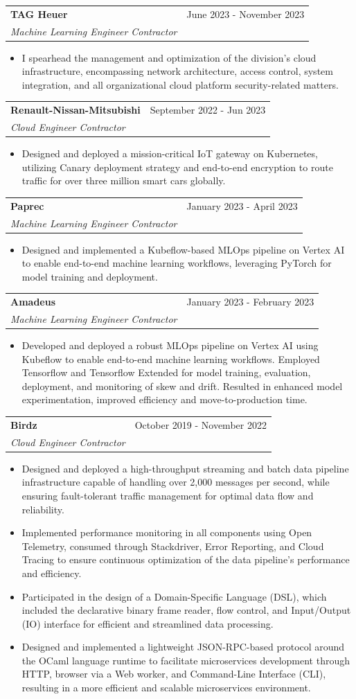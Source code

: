 \documentclass[letterpaper,11pt]{article}
\makeatletter
\newcommand{\resumeItem}[1]{
  \item\small{#1 \vspace{-2pt}}
}
\newcommand{\resumeSubheading}[3]{
  \vspace{-1pt}\item
    \begin{tabular*}{0.97\textwidth}[t]{l@{\extracolsep{\fill}}r}
      \textbf{#1} & #2 \\
      \textit{\small #3} \\
    \end{tabular*}\vspace{-5pt}
}
\newcommand{\resumeItemListStart}{\begin{itemize}}
\newcommand{\resumeItemListEnd}{\end{itemize}\vspace{-5pt}}
\makeatother
\begin{document}
\resumeSubheading{TAG Heuer}
{June 2023 - November 2023}
{Machine Learning Engineer Contractor}
\resumeItemListStart{}
\resumeItem{
	I spearhead the management and optimization of the division's cloud
	infrastructure, encompassing network architecture, access control, system
	integration, and all organizational cloud platform security-related matters.
}
\resumeItemListEnd{}


\resumeSubheading{Renault-Nissan-Mitsubishi}
{September 2022 - Jun 2023}
{Cloud Engineer Contractor}
\resumeItemListStart{}
\resumeItem{
	Designed and deployed a mission-critical IoT gateway on Kubernetes, utilizing
	Canary deployment strategy and end-to-end encryption to route traffic for over
	three million smart cars globally.
}
\resumeItemListEnd{}


\resumeSubheading{Paprec}
{January 2023 - April 2023}
{Machine Learning Engineer Contractor}
\resumeItemListStart{}
\resumeItem{
	Designed and implemented a Kubeflow-based MLOps pipeline on Vertex AI to enable
	end-to-end machine learning workflows, leveraging PyTorch for model training and
	deployment.
}
\resumeItemListEnd{}


\resumeSubheading{Amadeus}
{January 2023 - February 2023}
{Machine Learning Engineer Contractor}
\resumeItemListStart{}
\resumeItem{
	Developed and deployed a robust MLOps pipeline on Vertex AI using Kubeflow to
	enable end-to-end machine learning workflows. Employed Tensorflow and Tensorflow
	Extended for model training, evaluation, deployment, and monitoring of skew and
	drift. Resulted in enhanced model experimentation, improved efficiency and
	move-to-production time.
}
\resumeItemListEnd{}


\resumeSubheading{Birdz}
{October 2019 - November 2022}
{Cloud Engineer Contractor}
\resumeItemListStart{}
\resumeItem{
	Designed and deployed a high-throughput streaming and batch data pipeline
	infrastructure capable of handling over 2,000 messages per second, while ensuring
	fault-tolerant traffic management for optimal data flow and reliability.
}
\resumeItem{
	Implemented performance monitoring in all components using Open Telemetry,
	consumed through Stackdriver, Error Reporting, and Cloud Tracing to ensure
	continuous optimization of the data pipeline's performance and efficiency.
}
\resumeItem{
	Participated in the design of a Domain-Specific Language (DSL), which included the
	declarative binary frame reader, flow control, and Input/Output (IO) interface
	for efficient and streamlined data processing.
}
\resumeItem{
	Designed and implemented a lightweight JSON-RPC-based protocol around the
	OCaml language runtime to facilitate microservices development through HTTP,
	browser via a Web worker, and Command-Line Interface (CLI), resulting in a more
	efficient and scalable microservices environment.
}
\resumeItemListEnd{}
\end{document}
